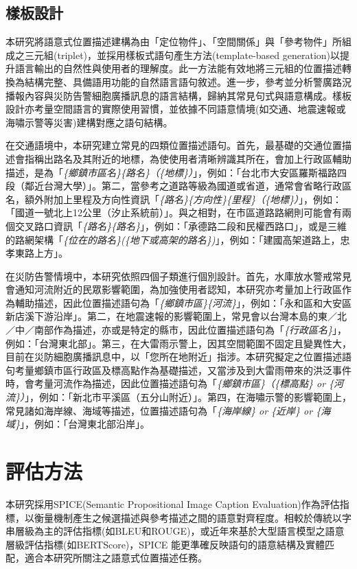 \subsection{樣板設計}

本研究將語意式位置描述建構為由「定位物件」、「空間關係」與「參考物件」所組成之三元組(triplet)，並採用樣板式語句產生方法(template-based generation)以提升語言輸出的自然性與使用者的理解度。此一方法能有效地將三元組的位置描述轉換為結構完整、具備語用功能的自然語言語句敘述。進一步，參考並分析警廣路況播報內容與災防告警細胞廣播訊息的語言結構，歸納其常見句式與語意構成。樣板設計亦考量空間語言的實際使用習慣，並依據不同語意情境(如交通、地震速報或海嘯示警等災害)建構對應之語句結構。

在交通語境中，本研究建立常見的四類位置描述語句。首先，最基礎的交通位置描述會指稱出路名及其附近的地標，為使使用者清晰辨識其所在，會加上行政區輔助描述，是為「\textit{\{鄉鎮市區名\}\{路名\}（\{地標\}）}」，例如：「台北市大安區羅斯福路四段（鄰近台灣大學）」。第二，當參考之道路等級為國道或省道，通常會省略行政區名，額外附加上里程及方向性資訊「\textit{\{路名\}\{方向性\}\{里程\}（\{地標\}）}」，例如：「國道一號北上12公里（汐止系統前）」。與之相對，在市區道路路網則可能會有兩個交叉路口資訊「\textit{\{路名\}\{路名\}}」，例如：「承德路二段和民權西路口」，或是三維的路網架構「\textit{\{位在的路名\}(\{地下或高架的路名\})}」，例如：「建國高架道路上，忠孝東路上方」。

在災防告警情境中，本研究依照四個子類進行個別設計。首先，水庫放水警戒常見會通知河流附近的民眾影響範圍，為加強使用者認知，本研究亦考量加上行政區作為輔助描述，因此位置描述語句為「\textit{\{鄉鎮市區\}\{河流\}}」，例如：「永和區和大安區新店溪下游沿岸」。第二，在地震速報的影響範圍上，常見會以台灣本島的東／北／中／南部作為描述，亦或是特定的縣市，因此位置描述語句為「\textit{\{行政區名\}}」，例如：「台灣東北部」。第三，在大雷雨示警上，因其空間範圍不固定且變異性大，目前在災防細胞廣播訊息中，以「您所在地附近」指涉。本研究擬定之位置描述語句考量鄉鎮市區行政區及標高點作為基礎描述，又當涉及到大雷雨帶來的洪泛事件時，會考量河流作為描述，因此位置描述語句為「\textit{\{鄉鎮市區\}（\{標高點\} or \{河流\}）}」，例如：「新北市平溪區（五分山附近）」。第四，在海嘯示警的影響範圍上，常見諸如海岸線、海域等描述，位置描述語句為「\textit{\{海岸線\} or \{近岸\} or \{海域\}}」，例如：「台灣東北部沿岸」。

\section{評估方法}

本研究採用SPICE(Semantic Propositional Image Caption Evaluation)作為評估指標\parencite{RN29}，以衡量機制產生之候選描述與參考描述之間的語意對齊程度。相較於傳統以字串層級為主的評估指標(如BLEU和ROUGE)，或近年來基於大型語言模型之語意層級評估指標(如BERTScore)，SPICE 能更準確反映語句的語意結構及實體匹配，適合本研究所關注之語意式位置描述任務。

